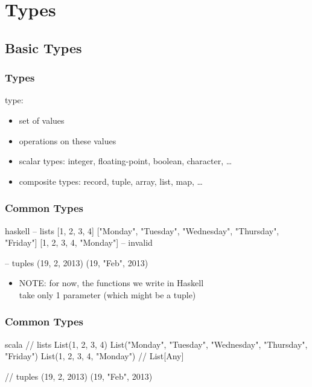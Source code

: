 \documentclass[dvipsnames]{beamer}
\theoremstyle{plain}
\begin{document}
\section{Types}

\subsection{Basic Types}

\begin{frame}
  \frametitle{Types}

  \begin{definition}
    \alert{type}:
    \begin{itemize}
      \item set of values
      \item operations on these values
    \end{itemize}
  \end{definition}

  \pause
  \medskip
  \begin{itemize}
    \item scalar types: integer, floating-point, boolean, character, \ldots
    \item composite types: record, tuple, array, list, map, \ldots
  \end{itemize}
\end{frame}

\begin{frame}[fragile]
  \frametitle{Common Types}

  \begin{example}[Haskell]
    \begin{pygments}{haskell}
-- lists
[1, 2, 3, 4]
["Monday", "Tuesday", "Wednesday", "Thursday", "Friday"]
[1, 2, 3, 4, "Monday"]  -- invalid

-- tuples
(19, 2, 2013)
(19, "Feb", 2013)
    \end{pygments}
  \end{example}

  \pause
  \begin{itemize}
    \item \alert{NOTE}: for now, the functions we write in Haskell\\
      take only 1 parameter (which might be a tuple)
  \end{itemize}
\end{frame}

\begin{frame}[fragile]
  \frametitle{Common Types}

  \begin{example}[Scala]
    \begin{pygments}{scala}
// lists
List(1, 2, 3, 4)
List("Monday", "Tuesday", "Wednesday", "Thursday", "Friday")
List(1, 2, 3, 4, "Monday")  // List[Any]

// tuples
(19, 2, 2013)
(19, "Feb", 2013)
    \end{pygments}
  \end{example}
\end{frame}
\end{document}
